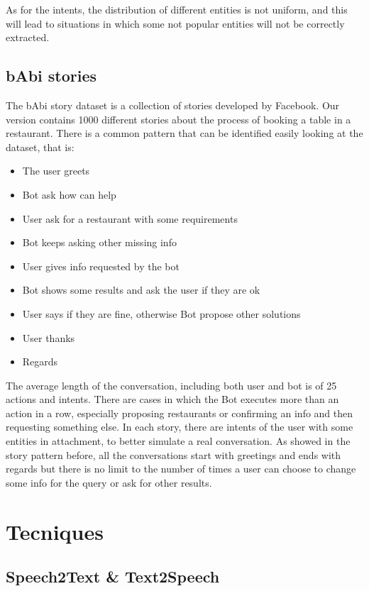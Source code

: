 \documentclass[11pt,a4paper]{article}
\begin{document}
As for the intents, the distribution of different entities is not uniform, and this will lead to situations in which some not popular entities will not be correctly extracted. 

\subsection{bAbi stories}

The bAbi story dataset is a collection of stories developed by Facebook. Our version contains 1000 different stories about the process of booking a table in a restaurant. There is a common pattern that can be identified easily looking at the dataset, that is:

\begin{itemize}
\item The user greets
\item Bot ask how can help
\item User ask for a restaurant with some requirements
\item Bot keeps asking other missing info
\item User gives info requested by the bot
\item Bot shows some results and ask the user if they are ok
\item User says if they are fine, otherwise Bot propose other solutions
\item User thanks
\item Regards
\end{itemize}

The average length of the conversation, including both user and bot is of 25 actions and intents. There are cases in which the Bot executes more than an action in a row, especially proposing restaurants or confirming an info and then requesting something else. In each story, there are intents of the user with some entities in attachment, to better simulate a real conversation. As showed in the story pattern before, all the conversations start with greetings and ends with regards but there is no limit to the number of times a user can choose to change some info for the query or ask for other results.

\section{Tecniques}

\subsection{Speech2Text \& Text2Speech}
\end{document}
